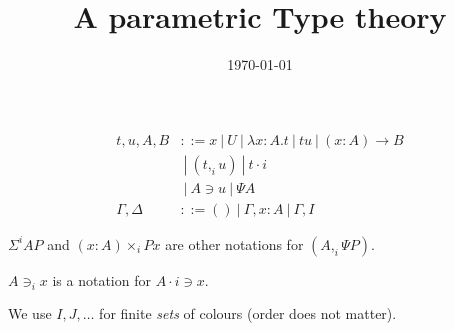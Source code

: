 \documentclass[10pt,a4paper]{article}
\title{A parametric Type theory}
\author{}
\date{\today}
\newcommand\CC[4]{(#2,_{#1} #3)}
\newcommand\CSig[1]{\Sigma^{#1}}
\newcommand\param[1]{\!\cdot\!#1}
\newcommand\op[1]{∋_{#1}}
\newcommand\ip{Ψ}
\begin{document}
\maketitle


\begin{definition}
  
  \begin{align*}
    t,u,A,B & ::= x ~|~ U ~|~ λx:A. t      ~|~ t u ~|~ (x:A) → B \\
            & ~|~ \CC i t u A  ~|~ t \param i  \\
            & ~|~ A ∋ u ~|~ \ip A \\
    \Gamma,\Delta & ::= () ~|~ \Gamma,x:A ~|~ \Gamma,I
  \end{align*}
\end{definition}
$\CSig i A P$ and $(x:A) ×_i P x$ are other notations for $(A ,_i \ip P)$.

$A \op i x$ is a notation for $A \param i ∋ x$.

We use $I,J,…$ for finite {\em sets} of colours (order does not matter).
\end{document}
